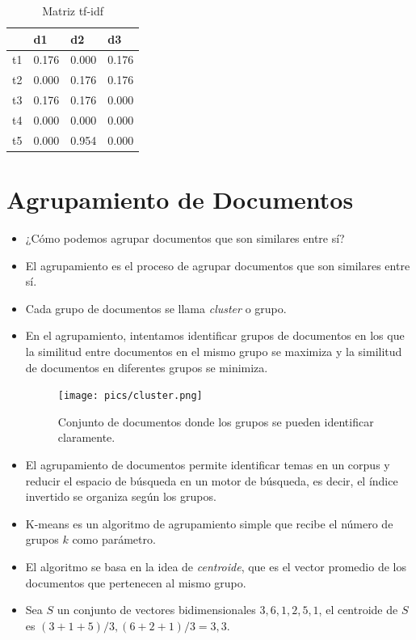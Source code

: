 \documentclass{book}
\begin{document}
 \begin{table}[htbp]
 \centering
\begin{tabular}{|l|r|r|r|}
\hline
 & \multicolumn{1}{l|}{d1} & \multicolumn{1}{l|}{d2} & \multicolumn{1}{l|}{d3} \\ \hline
t1 & 0.176 & 0.000 & 0.176 \\ \hline
t2 & 0.000 & 0.176 & 0.176 \\ \hline
t3 & 0.176 & 0.176 & 0.000 \\ \hline
t4 & 0.000 & 0.000 & 0.000 \\ \hline
t5 & 0.000 & 0.954 & 0.000 \\ \hline
\end{tabular}
\caption{Matriz tf-idf}
\end{table}

\section{Agrupamiento de Documentos}

\begin{itemize}
\item ¿Cómo podemos agrupar documentos que son similares entre sí?
\item El agrupamiento es el proceso de agrupar documentos que son similares entre sí.
\item Cada grupo de documentos se llama \emph{cluster} o grupo.
\item En el agrupamiento, intentamos identificar grupos de documentos en los que la similitud entre documentos en el mismo grupo se maximiza y la similitud de documentos en diferentes grupos se minimiza.
\begin{figure}[h!]
\centering
\texttt{[image: pics/cluster.png]}
\caption{ Conjunto de documentos donde los grupos se pueden identificar claramente.}
\end{figure}
\item El agrupamiento de documentos permite identificar temas en un corpus y reducir el espacio de búsqueda en un motor de búsqueda, es decir, el índice invertido se organiza según los grupos.
\item K-means es un algoritmo de agrupamiento simple que recibe el número de grupos $k$ como parámetro.
\item El algoritmo se basa en la idea de \emph{centroide}, que es el vector promedio de los documentos que pertenecen al mismo grupo.
\item Sea $S$ un conjunto de vectores bidimensionales ${3,6}, {1,2}, {5,1}$, el centroide de $S$ es ${(3+1+5)/3,(6+2+1)/3} = {3,3}$.

\end{itemize}
\end{document}
